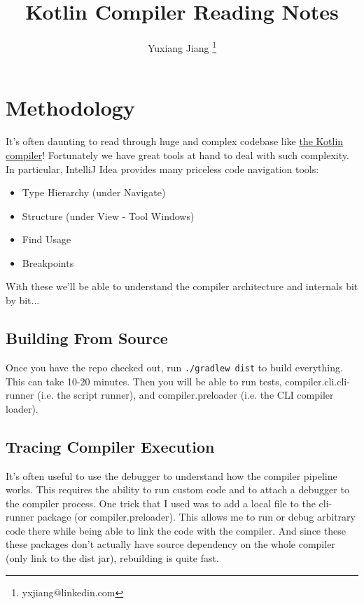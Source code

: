 \documentclass{article}
\begin{document}
\title{Kotlin Compiler Reading Notes}
\author{Yuxiang Jiang \thanks{yxjiang@linkedin.com}}
\maketitle

\newcommand{\textSafeTo}{\texorpdfstring{$\to$}{to} }

\tableofcontents
\clearpage

\section{Methodology}
It's often daunting to read through huge and complex codebase like \href{https://github.com/JetBrains/kotlin}{the Kotlin compiler}! Fortunately we have great tools at hand to deal with such complexity. In particular, IntelliJ Idea provides many priceless code navigation tools:
\begin{itemize}
    \item Type Hierarchy (under Navigate)
    \item Structure (under View - Tool Windows)
    \item Find Usage
    \item Breakpoints
\end{itemize}

With these we'll be able to understand the compiler architecture and internals bit by bit...

\subsection{Building From Source}
Once you have the repo checked out, run \texttt{./gradlew dist} to build everything. This can take 10-20 minutes. Then you will be able to run tests, compiler.cli.cli-runner (i.e. the script runner), and compiler.preloader (i.e. the CLI compiler loader).

\subsection{Tracing Compiler Execution}

It's often useful to use the debugger to understand how the compiler pipeline works. This requires the ability to run custom code and to attach a debugger to the compiler process. One trick that I used was to add a local file to the cli-runner package (or compiler.preloader). This allows me to run or debug arbitrary code there while being able to link the code with the compiler. And since these these packages don't actually have source dependency on the whole compiler (only link to the dist jar), rebuilding is quite fast.
\end{document}

